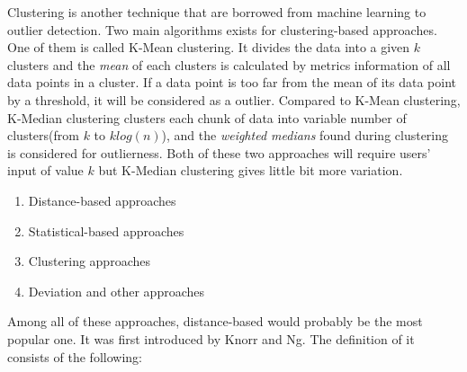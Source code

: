 \documentclass[11pt]{article}       %
\begin{document}
Clustering is another technique that are borrowed from machine learning to outlier detection. Two main algorithms exists for clustering-based approaches. One of them is called K-Mean clustering\cite{4666541}. It divides the data into a given $k$ clusters and the \emph{mean} of each clusters is calculated by metrics information of all data points in a cluster. If a data point is too far from the mean of its data point by a threshold, it will be considered as a outlier. Compared to K-Mean clustering, K-Median clustering\cite{DBLP:journals/corr/abs-1002-4003} clusters each chunk of data into variable number of clusters(from $k$ to $k log(n)$), and the \emph{weighted medians} found during clustering is considered for outlierness. Both of these two approaches will require users' input of value $k$ but K-Median clustering gives little bit more variation. 


\begin{enumerate}
  \item Distance-based approaches
  \item Statistical-based approaches
  \item Clustering approaches
  \item Deviation and other approaches
\end{enumerate}

Among all of these approaches, distance-based would probably be the most popular one. It was first introduced by Knorr and Ng\cite{EKnorr:1998}. The definition of it consists of the following:



\end{document}
